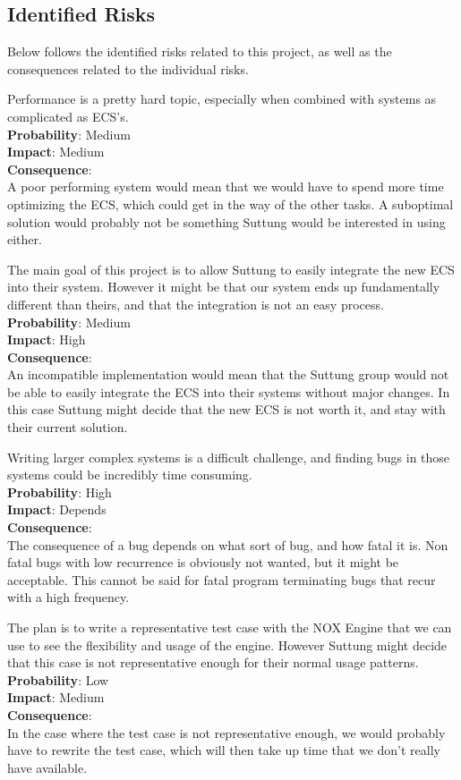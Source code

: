 \subsection{Identified Risks}
Below follows the identified risks related to this project, 
as well as the consequences related to the individual risks.

Performance is a pretty hard topic, especially when combined with
systems as complicated as ECS's.\\
\textbf{Probability}: Medium\\
\textbf{Impact}: Medium\\
\textbf{Consequence}:\\
A poor performing system would mean that we would have to spend more time
optimizing the ECS, which could get in the way of the other tasks.
A suboptimal solution would probably not be something Suttung would be interested
in using either.

The main goal of this project is to allow Suttung to easily integrate the new ECS
into their system. 
However it might be that our system ends up fundamentally different than theirs,
and that the integration is not an easy process.\\
\textbf{Probability}: Medium\\
\textbf{Impact}: High\\
\textbf{Consequence}:\\ 
An incompatible implementation would mean that the Suttung group would not be able to
easily integrate the ECS into their systems without major changes. 
In this case Suttung might decide that the new ECS is not worth it,
and stay with their current solution.

Writing larger complex systems is a difficult challenge, and finding bugs in those systems could be incredibly time consuming.\\
\textbf{Probability}: High\\
\textbf{Impact}: Depends\\
\textbf{Consequence}:\\
The consequence of a bug depends on what sort of bug, 
and how fatal it is. Non fatal bugs with low recurrence is obviously not wanted,
but it might be acceptable. This cannot be said for fatal program terminating bugs
that recur with a high frequency.

The plan is to write a representative test case with the NOX Engine that we can use
to see the flexibility and usage of the engine. However Suttung might decide that this
case is not representative enough for their normal usage patterns.\\
\textbf{Probability}: Low\\
\textbf{Impact}: Medium\\
\textbf{Consequence}:\\
In the case where the test case is not representative enough, we would probably have to
rewrite the test case, which will then take up time that we don't really have available.

